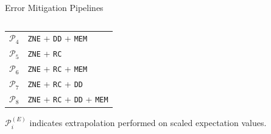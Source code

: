 \documentclass[11pt,aspectratio=1610,xcolor=dvipsnames]{beamer}
\begin{document}
\begin{frame}{Error Mitigation Pipelines}
\begin{columns}
\begin{column}{0.5\textwidth}
\begin{table}[h]
\begin{tabular}{c l}
					$\mathcal{P}_4$ & \texttt{ZNE} + \texttt{DD} + \texttt{MEM}               \\
					$\mathcal{P}_5$ & \texttt{ZNE} + \texttt{RC}                              \\
					$\mathcal{P}_6$ & \texttt{ZNE} + \texttt{RC} + \texttt{MEM}               \\
					$\mathcal{P}_7$ & \texttt{ZNE} + \texttt{RC} + \texttt{DD}                \\
					$\mathcal{P}_8$ & \texttt{ZNE} + \texttt{RC} + \texttt{DD} + \texttt{MEM}
				\end{tabular}
			\end{table}

			$\mathcal{P}_i^{(E)}$ indicates extrapolation performed on scaled expectation values.
		\end{column}
	\end{columns}
\end{frame}
\end{document}
